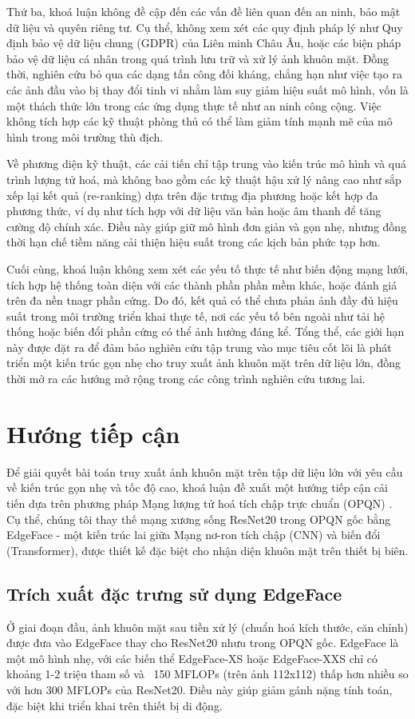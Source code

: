 Thứ ba, khoá luận không đề cập đến các vấn đề liên quan đến an ninh, bảo mật dữ liệu và quyên riêng tư. Cụ thể, không xem xét các quy định pháp lý như Quy định bảo vệ dữ liệu chung (GDPR) của Liên minh Châu Âu, hoặc các biện pháp bảo vệ dữ liệu cá nhân trong quá trình lưu trữ và xử lý ảnh khuôn mặt. Đồng thời, nghiên cứu bỏ qua các dạng tấn công đối kháng, chẳng hạn như việc tạo ra các ảnh đầu vào bị thay đổi tinh vi nhằm làm suy giảm hiệu suất mô hình, vốn là một thách thức lớn trong các ứng dụng thực tế như an ninh công cộng. Việc không tích hợp các kỹ thuật phòng thủ có thể làm giảm tính mạnh mẽ của mô hình trong môi trường thù địch.

Về phương diện kỹ thuật, các cải tiến chỉ tập trung vào kiến trúc mô hình và quá trình lượng tử hoá, mà không bao gồm các kỹ thuật hậu xử lý nâng cao như sắp xếp lại kết quả (re-ranking) dựa trên đặc trưng địa phương hoặc kết hợp đa phương thức, ví dụ như tích hợp với dữ liệu văn bản hoặc âm thanh để tăng cường độ chính xác. Điều này giúp giữ mô hình đơn giản và gọn nhẹ, nhưng đồng thời hạn chế tiềm năng cải thiện hiệu suất trong các kịch bản phức tạp hơn.

Cuối cùng, khoá luận không xem xét các yếu tố thực tế như biến động mạng lưới, tích hợp hệ thống toàn diện với các thành phần phần mềm khác, hoặc đánh giá trên đa nền tnagr phần cứng. Do đó, kết quả có thể chưa phản ảnh đầy đủ hiệu suất trong môi trường triển khai thực tế, nơi các yếu tố bên ngoài như tải hệ thống hoặc biến đổi phần cứng có thể ảnh hưởng đáng kể. Tổng thể, các giới hạn này được đặt ra để đảm bảo nghiên cứu tập trung vào mục tiêu cốt lõi là phát triển một kiến trúc gọn nhẹ cho truy xuất ảnh khuôn mặt trên dữ liệu lớn, đồng thời mở ra các hướng mở rộng trong các công trình nghiên cứu tương lai.

\section{Hướng tiếp cận}
Để giải quyết bài toán truy xuất ảnh khuôn mặt trên tập dữ liệu lớn với yêu cầu về kiến trúc gọn nhẹ và tốc độ cao, khoá luận đề xuất một hướng tiếp cận cải tiến dựa trên phương pháp Mạng lượng tử hoá tích chập trực chuẩn (OPQN) \cite{opqn}. Cụ thể, chúng tôi thay thế mạng xương sống ResNet20 trong OPQN gốc bằng EdgeFace - một kiến trúc lai giữa Mạng nơ-ron tích chập (CNN) và biến đổi (Transformer), được thiết kế đặc biệt cho nhận diện khuôn mặt trên thiết bị biên.

\subsection{Trích xuất đặc trưng sử dụng EdgeFace}
Ở giai đoạn đầu, ảnh khuôn mặt sau tiền xử lý (chuẩn hoá kích thước, căn chỉnh) được đưa vào EdgeFace thay cho ResNet20 nhưu trong OPQN gốc. EdgeFace là một mô hình nhẹ, với các biến thể EdgeFace-XS hoặc EdgeFace-XXS chỉ có khoảng 1-2 triệu tham số và ~150 MFLOPs (trên ảnh 112x112) thấp hơn nhiều so với hơn 300 MFLOPs của ResNet20. Điều này giúp giảm gánh nặng tính toán, đặc biệt khi triển khai trên thiết bị di động. 

